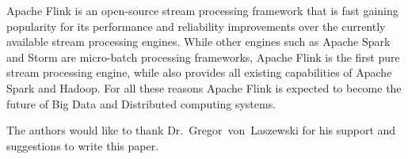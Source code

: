 Apache Flink is an  open-source stream processing framework that is fast gaining popularity for its performance and reliability improvements over the currently available stream processing engines. While other engines such as Apache Spark and Storm are micro-batch processing frameworks, Apache Flink is the first pure stream processing engine, while also provides all existing capabilities of Apache Spark and Hadoop. For all these reasons Apache Flink is expected to become the future of Big Data and Distributed computing systems.

\begin{acks}

  The authors would like to thank Dr.~Gregor~von~Laszewski for his
  support and suggestions to write this paper.

\end{acks}




 
